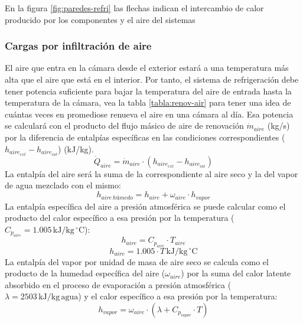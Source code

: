  En la figura \ref{fig:paredes-refri} las flechas indican el intercambio de calor producido por los componentes y el aire del sistemas
 
 
 \subsubsection{Cargas por infiltración de aire }
 
 El aire que entra en la cámara desde el exterior estará a una temperatura más alta que el aire que está en el interior. Por tanto, el sistema de refrigeración debe tener potencia suficiente para bajar la temperatura del aire de entrada hasta la temperatura de la cámara, vea la tabla \ref{tabla:renov-air} para tener una idea de cuántas veces en promediose renueva el aire en una cámara al día. Esa potencia se calculará con el producto del flujo másico de aire de renovación \( \dot{m}_{aire} \) (kg/s) por la diferencia de entalpías específicas en las condiciones correspondientes (\( h_{aire_{ext}} - h_{aire_{int}} \)) (kJ/kg).
 \begin{equation}
 	\dot{Q}_{aire} = \dot{m}_{aire} \cdot (h_{aire_{ext}} - h_{aire_{int}})
 \end{equation}
 La entalpía del aire será la suma de la correspondiente al aire seco y la del vapor de agua mezclado con el mismo:
 \begin{equation}\label{eq:entalp-air}
 	h_{aire \, húmedo} = h_{aire} + \omega_{aire} \cdot h_{vapor}
 \end{equation}
 La entalpía específica del aire a presión atmosférica se puede calcular como el producto del calor específico a esa presión por la temperatura (\( C_{p_{aire}} = 1.005 \, \text{kJ/kg} \, ^\circ \text{C} \)):
 \begin{equation}
 	h_{aire} = C_{p_{aire}} \cdot T_{aire}
 \end{equation}
 \begin{equation}
 	h_{aire} = 1.005 \cdot T \, \text{kJ/kg} \, ^\circ \text{C} 
 \end{equation}
 La entalpía del vapor por unidad de masa de aire seco se calcula como el producto de la humedad específica del aire (\( \omega_{aire} \)) por la suma del calor latente absorbido en el proceso de evaporación a presión atmosférica (\( \lambda = 2503 \, \text{kJ/kg} \, \text{agua} \)) y el calor específico a esa presión por la temperatura:
 \begin{equation}
 	h_{vapor} = \omega_{aire} \cdot (\lambda + C_{p_{vapor}} \cdot T)
 \end{equation}
